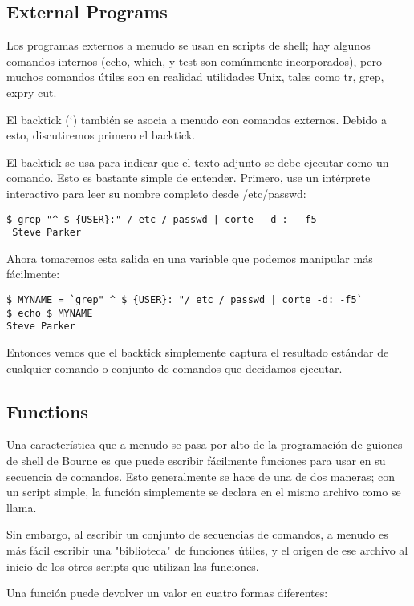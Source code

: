 \documentclass[12pt]{article}
\begin{document}
\subsection{External Programs}

Los programas externos a menudo se usan en scripts de shell; hay algunos comandos internos (echo, which, y test son comúnmente incorporados), pero muchos comandos útiles son en realidad utilidades Unix, tales como tr, grep, expry cut.

El backtick (`) también se asocia a menudo con comandos externos. Debido a esto, discutiremos primero el backtick.

El backtick se usa para indicar que el texto adjunto se debe ejecutar como un comando. Esto es bastante simple de entender. Primero, use un intérprete interactivo para leer su nombre completo desde /etc/passwd:

\begin{verbatim}
$ grep "^ $ {USER}:" / etc / passwd | corte - d : - f5
 Steve Parker
\end{verbatim}

Ahora tomaremos esta salida en una variable que podemos manipular más fácilmente:

\begin{verbatim}
$ MYNAME = `grep" ^ $ {USER}: "/ etc / passwd | corte -d: -f5`
$ echo $ MYNAME
Steve Parker
\end{verbatim}

Entonces vemos que el backtick simplemente captura el resultado estándar de cualquier comando o conjunto de comandos que decidamos ejecutar.

\subsection{Functions}

Una característica que a menudo se pasa por alto de la programación de guiones de shell de Bourne es que puede escribir fácilmente funciones para usar en su secuencia de comandos. Esto generalmente se hace de una de dos maneras; con un script simple, la función simplemente se declara en el mismo archivo como se llama.

Sin embargo, al escribir un conjunto de secuencias de comandos, a menudo es más fácil escribir una "biblioteca" de funciones útiles, y el origen de ese archivo al inicio de los otros scripts que utilizan las funciones.

Una función puede devolver un valor en cuatro formas diferentes:
\end{document}
